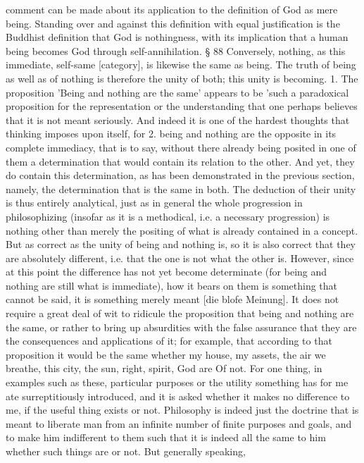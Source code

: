 comment can be made about its application to the definition of God as mere
being. Standing over and against this definition with equal justification is the
Buddhist definition that God is nothingness, with its implication that a human
being becomes God through self-annihilation.
§ 88
Conversely, nothing, as this immediate, self-same [category], is likewise the
same as being. The truth of being as well as of nothing is therefore the unity
of both; this unity is becoming.
1. The proposition 'Being and nothing are the same' appears to be 'such
a paradoxical proposition for the representation or the understanding
that one perhaps believes that it is not meant seriously. And indeed it
is one of the hardest thoughts that thinking imposes upon itself, for
2.
being and nothing are the opposite in its complete immediacy, that is to
say, without there already being posited in one of them a determination
that would contain its relation to the other. And yet, they do contain this
determination, as has been demonstrated in the previous section, namely,
the determination that is the same in both. The deduction of their unity
is thus entirely analytical, just as in general the whole progression in
philosophizing (insofar as it is a methodical, i.e. a necessary progression)
is nothing other than merely the positing of what is already contained
in a concept. But as correct as the unity of being and nothing is, so
it is also correct that they are absolutely different, i.e. that the one is not
what the other is. However, since at this point the difference has not yet
become determinate (for being and nothing are still what is immediate),
how it bears on them is something that cannot be said, it is something
merely meant [die blofe Meinung].
It does not require a great deal of wit to ridicule the proposition that
being and nothing are the same, or rather to bring up absurdities with
the false assurance that they are the consequences and applications of
it; for example, that according to that proposition it would be the same
whether my house, my assets, the air we breathe, this city, the sun,
right, spirit, God are Of not. For one thing, in examples such as these,
particular purposes or the utility something has for me ate surreptitiously
introduced, and it is asked whether it makes no difference to me, if the
useful thing exists or not. Philosophy is indeed just the doctrine that is
meant to liberate man from an infinite number of finite purposes and
goals, and to make him indifferent to them such that it is indeed all
the same to him whether such things are or not. But generally speaking,
